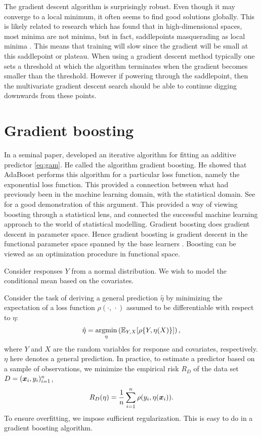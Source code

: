 The gradient descent algorithm is surprisingly robust. Even though it may converge to a local minimum, it often seems to find good solutions globally. This is likely related to research which has found that in high-dimensional spaces, most minima are not minima, but in fact, saddlepoints masquerading as local minima \citep{saddlepoints}. This means that training will slow since the gradient will be small at this saddlepoint or plateau. When using a gradient descent method typically one sets a threshold at which the algorithm terminates when the gradient becomes smaller than the threshold. However if powering through the saddlepoint, then the multivariate gradient descent search should be able to continue digging downwards from these points.

\section{Gradient boosting}
In a seminal paper, \citet{friedman2001} developed an iterative algorithm for fitting an additive predictor \eqref{eq:gam}.
He called the algorithm gradient boosting.
He showed that AdaBoost performs this algorithm for a particular loss function, namely the exponential loss function.
This provided a connection between what had previously been in the machine learning domain, with the statistical domain. See \citet{ESL} for a good demonstration of this argument. This provided a way of viewing boosting through a statistical lens, and connected the successful machine learning approach to the world of statistical modelling. Gradient boosting does gradient descent in parameter space. Hence gradient boosting is gradient descent in the functional parameter space spanned by the base learners \citep{friedman2001}. Boosting can be viewed as an optimization procedure in functional space.

Consider responses $Y$ from a normal distribution. We wish to model the conditional mean based on the covariates.

Consider the task of deriving a general prediction $\hat{\eta}$ by minimizing the expectation of a loss function $\rho(\cdot,\,\cdot)$
assumed to be differentiable with respect to $\eta$:
\begin{equation}\label{eq:min}
    \hat{\eta}=\operatorname*{argmin}_\eta\left(\mathbb{E}_{Y,X}[\rho\{Y,\eta(X)\}]\right),
\end{equation}
where $Y$ and $X$ are the random variables for response and covariates, respectively. $\eta$ here denotes a general prediction.
In practice, to estimate a predictor based on a sample of observations, we minimize the empirical risk $R_D$ of the data set
$D=(\bm{x}_i,y_i)_{i=1}^n$,
\begin{equation}
    R_D(\eta)=\frac{1}{n}\sum_{i=1}^n \rho(y_i,\eta(\bm{x}_i)).
\end{equation}
To ensure overfitting, we impose sufficient regularization. This is easy to do in a gradient boosting algorithm.

